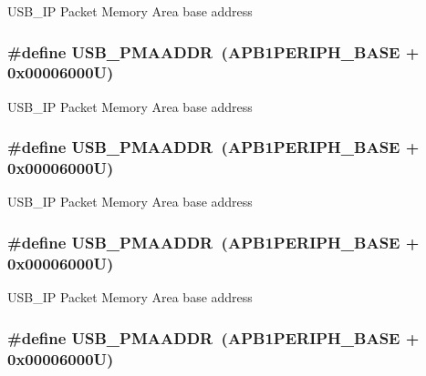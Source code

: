 U\-S\-B\-\_\-\-I\-P Packet Memory Area base address \hypertarget{group___peripheral__memory__map_gaf992dfdd5707568c5cb5506e2347e808}{
\subsubsection[{U\-S\-B\-\_\-\-P\-M\-A\-A\-D\-D\-R}]{\setlength{\rightskip}{0pt plus 5cm}\#define U\-S\-B\-\_\-\-P\-M\-A\-A\-D\-D\-R~(A\-P\-B1\-P\-E\-R\-I\-P\-H\-\_\-\-B\-A\-S\-E + 0x00006000\-U)}}\label{group___peripheral__memory__map_gaf992dfdd5707568c5cb5506e2347e808}
U\-S\-B\-\_\-\-I\-P Packet Memory Area base address \hypertarget{group___peripheral__memory__map_gaf992dfdd5707568c5cb5506e2347e808}{
\subsubsection[{U\-S\-B\-\_\-\-P\-M\-A\-A\-D\-D\-R}]{\setlength{\rightskip}{0pt plus 5cm}\#define U\-S\-B\-\_\-\-P\-M\-A\-A\-D\-D\-R~(A\-P\-B1\-P\-E\-R\-I\-P\-H\-\_\-\-B\-A\-S\-E + 0x00006000\-U)}}\label{group___peripheral__memory__map_gaf992dfdd5707568c5cb5506e2347e808}
U\-S\-B\-\_\-\-I\-P Packet Memory Area base address \hypertarget{group___peripheral__memory__map_gaf992dfdd5707568c5cb5506e2347e808}{
\subsubsection[{U\-S\-B\-\_\-\-P\-M\-A\-A\-D\-D\-R}]{\setlength{\rightskip}{0pt plus 5cm}\#define U\-S\-B\-\_\-\-P\-M\-A\-A\-D\-D\-R~(A\-P\-B1\-P\-E\-R\-I\-P\-H\-\_\-\-B\-A\-S\-E + 0x00006000\-U)}}\label{group___peripheral__memory__map_gaf992dfdd5707568c5cb5506e2347e808}
U\-S\-B\-\_\-\-I\-P Packet Memory Area base address \hypertarget{group___peripheral__memory__map_gaf992dfdd5707568c5cb5506e2347e808}{
\subsubsection[{U\-S\-B\-\_\-\-P\-M\-A\-A\-D\-D\-R}]{\setlength{\rightskip}{0pt plus 5cm}\#define U\-S\-B\-\_\-\-P\-M\-A\-A\-D\-D\-R~(A\-P\-B1\-P\-E\-R\-I\-P\-H\-\_\-\-B\-A\-S\-E + 0x00006000\-U)}}\label{group___peripheral__memory__map_gaf992dfdd5707568c5cb5506e2347e808}
